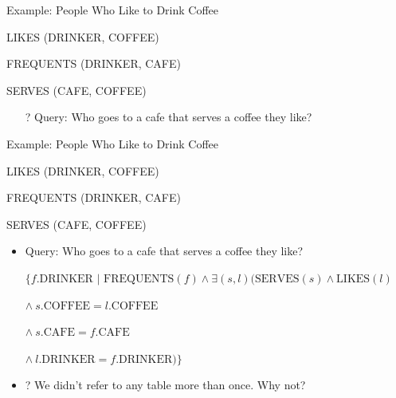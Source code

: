 \documentclass[aspectratio=169]{beamer}
\newenvironment{noindentitemize}
{ \begin{itemize}
 \setlength{\itemsep}{1.5ex}
  \setlength{\parsep}{0pt}   
  \setlength{\parskip}{0pt}
 \addtolength{\leftskip}{-2em}
 }
{ \end{itemize} }
\begin{document}
%
%
\begin{frame}{Example: People Who Like to Drink Coffee}

LIKES (DRINKER, COFFEE)

FREQUENTS (DRINKER, CAFE)

SERVES (CAFE, COFFEE)

\begin{itemize}
\item[?] Query: Who goes to a cafe that serves a coffee they like?
\end{itemize}
\end{frame}

\begin{frame}{Example: People Who Like to Drink Coffee}

LIKES (DRINKER, COFFEE)

FREQUENTS (DRINKER, CAFE)

SERVES (CAFE, COFFEE)

\begin{noindentitemize}
\item Query: Who goes to a cafe that serves a coffee they like?

\vspace{10 pt}
$\{f.\textrm{DRINKER } | \textrm{ FREQUENTS}(f) \wedge \exists(s, l)(\textrm{SERVES}(s) \wedge \textrm{LIKES}(l)$

\hspace{2em} $\wedge\ s.\textrm{COFFEE} = l.\textrm{COFFEE}$

\hspace{2em} $\wedge\ s.\textrm{CAFE} = f.\textrm{CAFE}$

\hspace{2em} $\wedge\ l.\textrm{DRINKER} = f.\textrm{DRINKER}) \}$

\item[?] We didn't refer to any table more than once. Why not?
\end{noindentitemize}
\end{frame}
\end{document}
